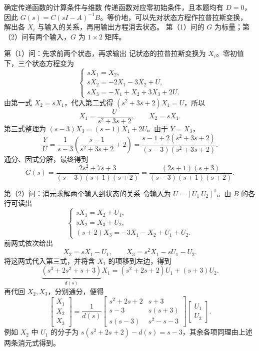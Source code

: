 \documentclass[11pt]{article}
\begin{document}
\begin{solution}
\begin{proofstep}{确定传递函数的计算条件与维数}
传递函数对应零初始条件，且本题均有 $D=0$，因此
$G(s)=C(sI-A)^{-1}B$。等价地，可以先对状态方程作拉普拉斯变换，
解出各 $X_i$ 与输入的关系，再用输出方程消去状态。
第（1）问的 $G$ 为标量；第（2）问有两个输入，$G$ 为 $1\times2$ 矩阵。
\end{proofstep}
\pagebreak
\begin{proofstep}{第（1）问：先求前两个状态，再求输出}
记状态的拉普拉斯变换为 $X_i$。零初值下，三个状态方程变为
\[
\begin{cases}
sX_1=X_2,\\
sX_2=-2X_1-3X_2+U,\\
sX_3=-X_1+X_2+3X_3+2U.
\end{cases}
\]
由第一式 $X_2=sX_1$，代入第二式得
$(s^2+3s+2)X_1=U$，所以
\[
X_1=\frac{U}{s^2+3s+2},\qquad X_2=sX_1.
\]
第三式整理为 $(s-3)X_3=(s-1)X_1+2U$。由于 $Y=X_3$，
\[
\frac YU=\frac1{s-3}\left(\frac{s-1}{s^2+3s+2}+2\right)
=\frac{s-1+2(s^2+3s+2)}{(s-3)(s^2+3s+2)}.
\]
通分、因式分解，最终得到
\[
\boxed{G(s)=\frac{2s^2+7s+3}{(s-3)(s+1)(s+2)}
=\frac{(2s+1)(s+3)}{(s-3)(s+1)(s+2)}.}
\]
\end{proofstep}
\begin{proofstep}{第（2）问：消元求解两个输入到状态的关系}
令输入为 $U=[U_1\ U_2]^{\mathsf T}$。由 $B$ 的各行可读出
\[
\begin{cases}
sX_1=X_2+U_1,\\
sX_2=X_3+U_2,\\
(s+2)X_3=-3X_1-X_2+U_1+U_2.
\end{cases}
\]
前两式依次给出
\[
X_2=sX_1-U_1,\qquad X_3=s^2X_1-sU_1-U_2.
\]
将这两式代入第三式，并将含 $X_1$ 的项移到左边，得到
\[
\underbrace{(s^3+2s^2+s+3)}_{d(s)}X_1
=(s^2+2s+2)U_1+(s+3)U_2.
\]
再代回 $X_2,X_3$，分别通分，便得
\[
\begin{bmatrix}X_1\\X_2\\X_3\end{bmatrix}=\frac{1}{d(s)}
\begin{bmatrix}
s^2+2s+2&s+3\\
s-3&s(s+3)\\
s(s-3)&s^2-s-3
\end{bmatrix}\begin{bmatrix}U_1\\U_2\end{bmatrix}.
\]
例如 $X_2$ 中 $U_1$ 的分子为
$s(s^2+2s+2)-d(s)=s-3$，其余各项同理由上述两条消元式得到。
\end{proofstep}

\end{solution}
\end{document}
